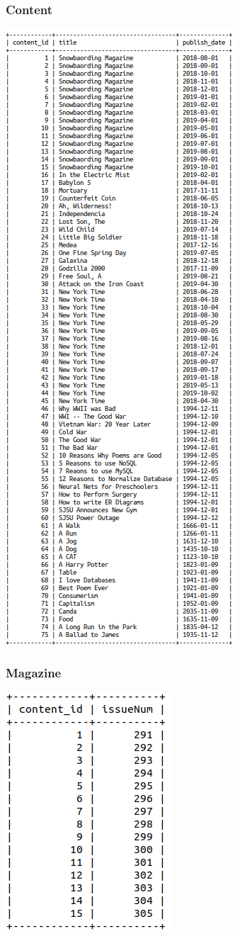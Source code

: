 \documentclass[letter, 12pt, titlepage]{article}
\begin{document}
		\subsubsection{Content}
			\includegraphics[scale=.7]{content.png}
		\subsubsection{Magazine}
			\includegraphics[scale=.5]{magazine.png}
\end{document}
